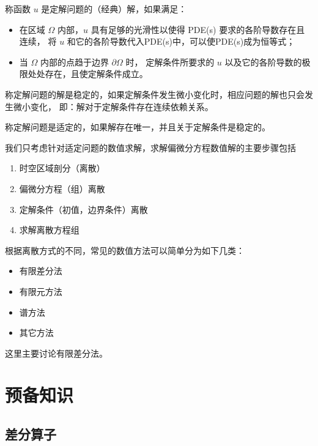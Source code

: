 \begin{definition}
    称函数 $u$ 是定解问题的（经典）解，如果满足：
    \begin{itemize}
        \item 在区域 $\Omega$ 内部，$u$ 具有足够的光滑性以使得 PDE(s) 要求的各阶导数存在且连续，
              将 $u$ 和它的各阶导数代入PDE(s)中，可以使PDE(s)成为恒等式；
        \item 当 $\Omega$ 内部的点趋于边界 $\partial \Omega$ 时，
              定解条件所要求的 $u$ 以及它的各阶导数的极限处处存在，且使定解条件成立。
    \end{itemize}
\end{definition}

\begin{definition}
    称定解问题的解是稳定的，如果定解条件发生微小变化时，相应问题的解也只会发生微小变化，
    即：解对于定解条件存在连续依赖关系。
\end{definition}

\begin{definition}
    称定解问题是适定的，如果解存在唯一，并且关于定解条件是稳定的。
\end{definition}



我们只考虑针对适定问题的数值求解，求解偏微分方程数值解的主要步骤包括
\begin{enumerate}
    \item 时空区域剖分（离散）
    \item 偏微分方程（组）离散
    \item 定解条件（初值，边界条件）离散
    \item 求解离散方程组
\end{enumerate}
根据离散方式的不同，常见的数值方法可以简单分为如下几类：
\begin{itemize}
    \item 有限差分法
    \item 有限元方法
    \item 谱方法
    \item 其它方法
\end{itemize}
这里主要讨论有限差分法。



\section{预备知识}

\subsection*{差分算子}

